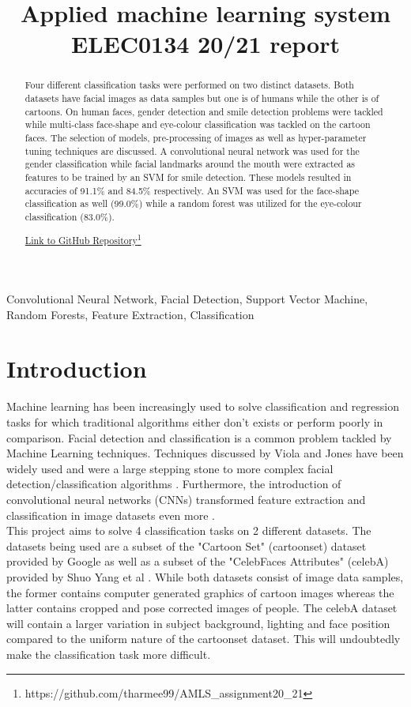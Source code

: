 \documentclass{article}
\title{Applied machine learning system ELEC0134 20/21 report}
\begin{document}
%
\maketitle
%
\begin{abstract}
    Four different classification tasks were performed on two distinct datasets. Both datasets have facial images as data samples but one is of humans while the other is of cartoons. On human faces, gender detection and smile detection problems were tackled while multi-class face-shape and eye-colour classification was tackled on the cartoon faces. The selection of models, pre-processing of images as well as hyper-parameter tuning techniques are discussed. A convolutional neural network was used for the gender classification while facial landmarks around the mouth were extracted as features to be trained by an SVM for smile detection. These models resulted in accuracies of 91.1\% and 84.5\% respectively. An SVM was used for the face-shape classification as well (99.0\%) while a random forest was utilized for the eye-colour classification (83.0\%).
    
    \href{https://github.com/tharmee99/AMLS_assignment20_21}{Link to GitHub Repository}\footnote{https://github.com/tharmee99/AMLS\_assignment20\_21}
\end{abstract}
%
\begin{keywords}
    Convolutional Neural Network, Facial Detection, Support Vector Machine, Random Forests, Feature Extraction, Classification
\end{keywords}
%

\section{Introduction}
\label{sec:introduction}
    Machine learning has been increasingly used to solve classification and regression tasks for which traditional algorithms either don't exists or perform poorly in comparison. Facial detection and classification is a common problem tackled by Machine Learning techniques. Techniques discussed by Viola and Jones \autocite{990517} have been widely used and were a large stepping stone to more complex facial detection/classification algorithms \autocite{8806572, 8549735}. Furthermore, the introduction of convolutional neural networks (CNNs) transformed feature extraction and classification in image datasets even more \autocite{6619290, 7553523}.
    \\
    
    This project aims to solve 4 classification tasks on 2 different datasets. The datasets being used are a subset of the "Cartoon Set" (cartoonset) dataset provided by Google \autocite{cartoonset} as well as a subset of the "CelebFaces Attributes" (celebA) provided by Shuo Yang et al \autocite{7410776}. While both datasets consist of image data samples, the former contains computer generated graphics of cartoon images whereas the latter contains cropped and pose corrected images of people. The celebA dataset will contain a larger variation in subject background, lighting and face position compared to the uniform nature of the cartoonset dataset. This will undoubtedly make the classification task more difficult.
    \\
    
\end{document}
